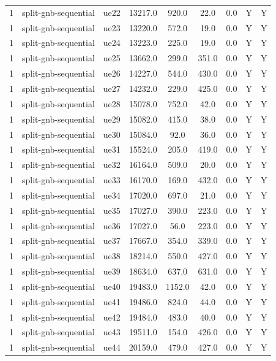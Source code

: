 \begin{table}[ht]
\begin{tabular}{|c|c|c|c|c|c|c|c|c|}
1 & split-gnb-sequential & ue22 & 13217.0 & 920.0 & 22.0 & 0.0 & Y & Y \\
1 & split-gnb-sequential & ue23 & 13220.0 & 572.0 & 19.0 & 0.0 & Y & Y \\
1 & split-gnb-sequential & ue24 & 13223.0 & 225.0 & 19.0 & 0.0 & Y & Y \\
1 & split-gnb-sequential & ue25 & 13662.0 & 299.0 & 351.0 & 0.0 & Y & Y \\
1 & split-gnb-sequential & ue26 & 14227.0 & 544.0 & 430.0 & 0.0 & Y & Y \\
1 & split-gnb-sequential & ue27 & 14232.0 & 229.0 & 425.0 & 0.0 & Y & Y \\
1 & split-gnb-sequential & ue28 & 15078.0 & 752.0 & 42.0 & 0.0 & Y & Y \\
1 & split-gnb-sequential & ue29 & 15082.0 & 415.0 & 38.0 & 0.0 & Y & Y \\
1 & split-gnb-sequential & ue30 & 15084.0 & 92.0 & 36.0 & 0.0 & Y & Y \\
1 & split-gnb-sequential & ue31 & 15524.0 & 205.0 & 419.0 & 0.0 & Y & Y \\
1 & split-gnb-sequential & ue32 & 16164.0 & 509.0 & 20.0 & 0.0 & Y & Y \\
1 & split-gnb-sequential & ue33 & 16170.0 & 169.0 & 432.0 & 0.0 & Y & Y \\
1 & split-gnb-sequential & ue34 & 17020.0 & 697.0 & 21.0 & 0.0 & Y & Y \\
1 & split-gnb-sequential & ue35 & 17027.0 & 390.0 & 223.0 & 0.0 & Y & Y \\
1 & split-gnb-sequential & ue36 & 17027.0 & 56.0 & 223.0 & 0.0 & Y & Y \\
1 & split-gnb-sequential & ue37 & 17667.0 & 354.0 & 339.0 & 0.0 & Y & Y \\
1 & split-gnb-sequential & ue38 & 18214.0 & 550.0 & 427.0 & 0.0 & Y & Y \\
1 & split-gnb-sequential & ue39 & 18634.0 & 637.0 & 631.0 & 0.0 & Y & Y \\
1 & split-gnb-sequential & ue40 & 19483.0 & 1152.0 & 42.0 & 0.0 & Y & Y \\
1 & split-gnb-sequential & ue41 & 19486.0 & 824.0 & 44.0 & 0.0 & Y & Y \\
1 & split-gnb-sequential & ue42 & 19484.0 & 483.0 & 40.0 & 0.0 & Y & Y \\
1 & split-gnb-sequential & ue43 & 19511.0 & 154.0 & 426.0 & 0.0 & Y & Y \\
1 & split-gnb-sequential & ue44 & 20159.0 & 479.0 & 427.0 & 0.0 & Y & Y \\

\end{tabular}
\end{table}
